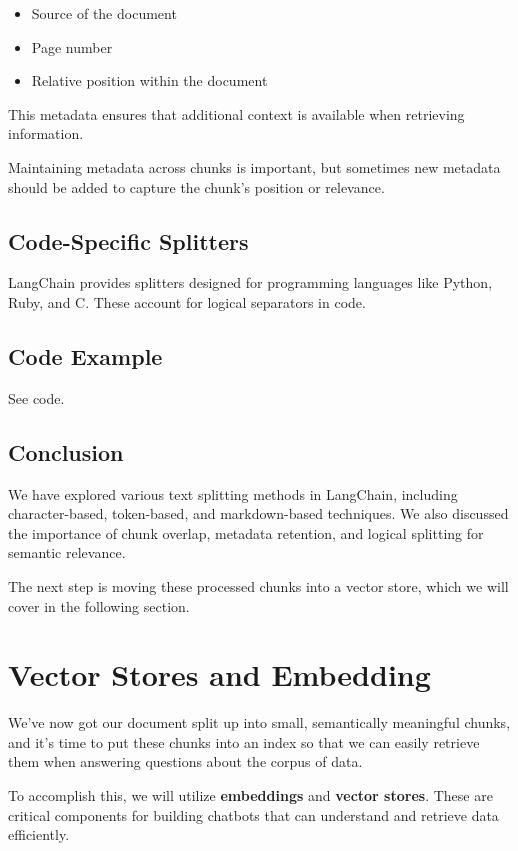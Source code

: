 \documentclass{article}
\begin{document}
\begin{itemize}
    \item Source of the document
    \item Page number
    \item Relative position within the document
\end{itemize}

This metadata ensures that additional context is available when retrieving information.

Maintaining metadata across chunks is important, but sometimes new metadata should be added to capture the chunk’s position or relevance.

\subsection{Code-Specific Splitters}

LangChain provides splitters designed for programming languages like Python, Ruby, and C. These account for logical separators in code.

\subsection{Code Example}

See code.

\subsection{Conclusion}
We have explored various text splitting methods in LangChain, including character-based, token-based, and markdown-based techniques. We also discussed the importance of chunk overlap, metadata retention, and logical splitting for semantic relevance.

The next step is moving these processed chunks into a vector store, which we will cover in the following section.

\section{Vector Stores and Embedding}

We've now got our document split up into small, semantically meaningful chunks, and it's time to put these chunks into an index so that we can easily retrieve them when answering questions about the corpus of data. 

To accomplish this, we will utilize \textbf{embeddings} and \textbf{vector stores}. These are critical components for building chatbots that can understand and retrieve data efficiently.
\end{document}
